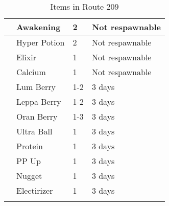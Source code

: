 \begin{longtable}{|| l l l l ||}%
\hline%
&Awakening&2&Not respawnable\\%
\hline%
&Hyper Potion&2&Not respawnable\\%
\hline%
&Elixir&1&Not respawnable\\%
\hline%
&Calcium&1&Not respawnable\\%
\hline%
&Lum Berry&1{-}2&3 days\\%
\hline%
&Leppa Berry&1{-}2&3 days\\%
\hline%
&Oran Berry&1{-}3&3 days\\%
\hline%
&Ultra Ball&1&3 days\\%
\hline%
&Protein&1&3 days\\%
\hline%
&PP Up&1&3 days\\%
\hline%
&Nugget&1&3 days\\%
\hline%
&Electirizer&1&3 days\\%
\hline%
\endhead%
\hline%
\caption{Items in Route 209}%
\label{tab:Route209Items}%
\end{longtable}